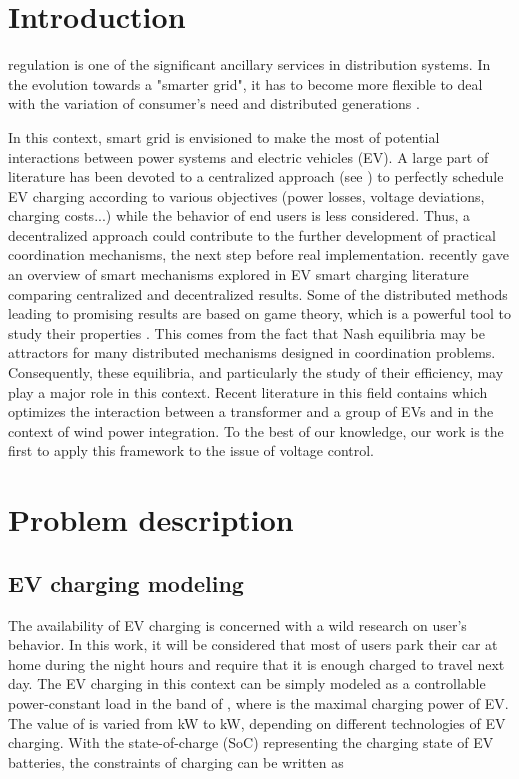 \documentclass[journal]{IEEEtran}
\begin{document}
\section{Introduction}



 regulation is one of the significant ancillary services  \cite{Geth2012}  in distribution systems. In the evolution towards a "smarter grid", it has to become more flexible to deal with the variation of consumer's need and distributed generations \cite{Baran2007}.   

In this context, smart grid is envisioned to make the most of potential interactions between power systems and electric vehicles (EV). A large part of literature has been devoted to a centralized approach (see \cite{Clement-Nyns2009}) to perfectly schedule EV charging according to various objectives (power losses, voltage deviations, charging costs...) while the behavior of end users is less considered. Thus, a decentralized approach could contribute to the further development of practical coordination mechanisms, the next step before real implementation. \cite{Leemput2011} recently gave an overview of smart mechanisms explored in EV smart charging literature comparing centralized and decentralized results. Some of the distributed methods leading to promising results are based on game theory, which is a powerful tool to study their properties \cite{Saad2012}. This comes from the fact that Nash equilibria may be attractors for many distributed mechanisms designed in coordination problems. Consequently, these equilibria, and particularly the study of their efficiency, may play a major role in this context. Recent literature in this field contains \cite{Gan2012} which optimizes the interaction between a transformer and a group of EVs and \cite{Wu2012} in the context of wind power integration. To the best of our knowledge, our work is the first to apply this framework to the issue of voltage control.

\section{Problem description}


\subsection{EV charging modeling}


The availability of EV charging is concerned with a wild research on user's behavior. In this work, it will be considered that most of users park their car at home during the night hours and require that it is enough charged to travel next day.  The EV charging in this context can be simply modeled as a controllable power-constant load in the band of , where  is the maximal charging power of EV. The value of  is varied from kW to kW, depending on different technologies of EV charging. With the state-of-charge (SoC) representing the charging state of EV batteries, the constraints of charging can be written as
\end{document}
